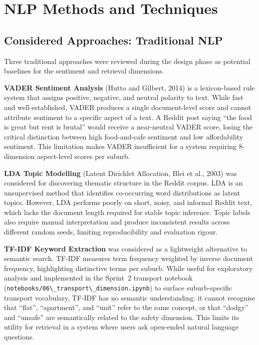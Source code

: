 \documentclass[11pt,a4paper]{article}
\newcommand{\passthrough}[1]{#1}
\begin{document}
\section{NLP Methods and Techniques}\label{5-nlp-methods-and-techniques}



\subsection{Considered Approaches: Traditional NLP}\label{52-considered-approaches-traditional-nlp}

Three traditional approaches were reviewed during the design phase as potential baselines for the sentiment and retrieval dimensions.

\textbf{VADER Sentiment Analysis} (Hutto and Gilbert, 2014) is a lexicon-based rule system that assigns positive, negative, and neutral polarity to text. While fast and well-established, VADER produces a single document-level score and cannot attribute sentiment to a specific aspect of a text. A Reddit post saying ``the food is great but rent is brutal'' would receive a near-neutral VADER score, losing the critical distinction between high food-and-cafe sentiment and low affordability sentiment. This limitation makes VADER insufficient for a system requiring 8-dimension aspect-level scores per suburb.

\textbf{LDA Topic Modelling} (Latent Dirichlet Allocation, Blei et al., 2003) was considered for discovering thematic structure in the Reddit corpus. LDA is an unsupervised method that identifies co-occurring word distributions as latent topics. However, LDA performs poorly on short, noisy, and informal Reddit text, which lacks the document length required for stable topic inference. Topic labels also require manual interpretation and produce inconsistent results across different random seeds, limiting reproducibility and evaluation rigour.

\textbf{TF-IDF Keyword Extraction} was considered as a lightweight alternative to semantic search. TF-IDF measures term frequency weighted by inverse document frequency, highlighting distinctive terms per suburb. While useful for exploratory analysis and implemented in the Sprint~2 transport notebook (\passthrough{\lstinline!notebooks/06\_transport\_dimension.ipynb!}) to surface suburb-specific transport vocabulary, TF-IDF has no semantic understanding: it cannot recognise that ``flat'', ``apartment'', and ``unit'' refer to the same concept, or that ``dodgy'' and ``unsafe'' are semantically related to the safety dimension. This limits its utility for retrieval in a system where users ask open-ended natural language questions.
\end{document}
